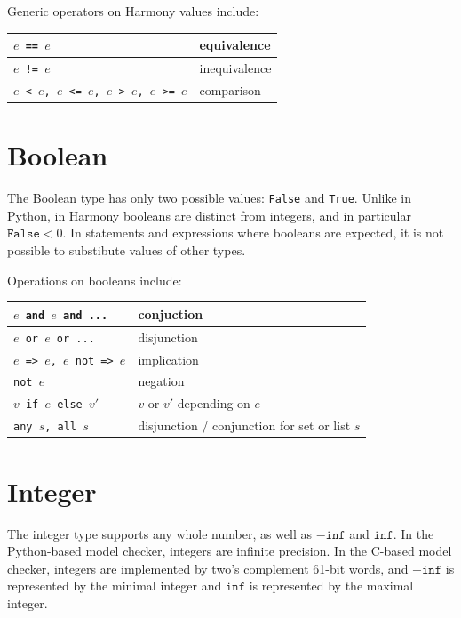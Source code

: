 \documentclass{report}
\begin{document}
Generic operators on Harmony values include:

\begin{center}
\begin{tabular}{|l|l|}
\hline
\texttt{$e$ == $e$} & equivalence \\
\hline
\texttt{$e$ != $e$} & inequivalence \\
\hline
\texttt{$e$ < $e$, $e$ <= $e$, $e$ > $e$, $e$ >= $e$} & comparison\\
\hline
\end{tabular}
\end{center}

\section{Boolean}

The Boolean type has only two possible values: \texttt{False} and
\texttt{True}.  Unlike in Python, in Harmony booleans are distinct
from integers, and in particular $\mathtt{False} < 0$.  In statements
and expressions where booleans are expected, it is not possible to
substibute values of other types.

Operations on booleans include:
\begin{center}
\begin{tabular}{|l|l|}
\hline
\texttt{$e$ and $e$ and ...} & conjuction \\
\hline
\texttt{$e$ or $e$ or ...} & disjunction \\
\hline
\texttt{$e$ => $e$, $e$ not => $e$} & implication \\
\hline
\texttt{not $e$} & negation \\
\hline
\texttt{$v$ if $e$ else $v'$} & $v$ or $v'$ depending on $e$ \\
\hline
\texttt{any $s$, all $s$} & disjunction / conjunction for set or list $s$ \\
\hline
\end{tabular}
\end{center}

\section{Integer}

The integer type supports any whole number, as well as $-\mathtt{inf}$
and $\mathtt{inf}$.  In the Python-based model checker, integers are
infinite precision.  In the C-based model checker, integers are implemented
by two's complement 61-bit words, and $-\mathtt{inf}$ is represented by
the minimal integer and $\mathtt{inf}$ is represented by the maximal integer.
\end{document}
